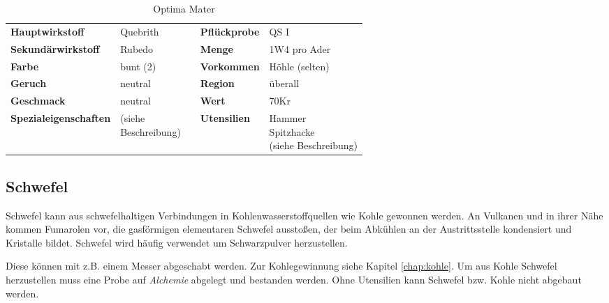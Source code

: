 \begin{table}[H] 
\begin{center} 
\begin{tabular}{|l|l|p{1cm}|l|l|} 
  	\cline{1-2} \cline{4-5} 
  	\textbf{Hauptwirkstoff} & Quebrith && \textbf{Pflückprobe} & QS I \\ \cline{1-2} \cline{4-5} 
  	\textbf{Sekundärwirkstoff} & Rubedo && \textbf{Menge} & 1W4 pro Ader \\ \cline{1-2} \cline{4-5} 
  	\textbf{Farbe} & bunt (2) && \textbf{Vorkommen} & Höhle (selten) \\ \cline{1-2} \cline{4-5} 
  	\textbf{Geruch} & neutral && \textbf{Region} & überall \\ \cline{1-2} \cline{4-5} 
  	\textbf{Geschmack} & neutral && \textbf{Wert} & 70Kr \\ \cline{1-2} \cline{4-5} 
  	\textbf{Spezialeigenschaften} & \brcell{(siehe \\ Beschreibung)} && \textbf{Utensilien} & \brcell{Hammer \\ Spitzhacke \\ (siehe Beschreibung)} \\ \cline{1-2} \cline{4-5} 
\end{tabular} 
\end{center} 
\caption{Optima Mater} 
\label{tab:optima_mater} 
\end{table}


\subsection{Schwefel}
\label{chap:schwefel}
Schwefel kann aus schwefelhaltigen Verbindungen in Kohlenwasserstoffquellen wie Kohle gewonnen werden. An Vulkanen und in ihrer Nähe kommen Fumarolen vor, die gasförmigen elementaren Schwefel ausstoßen, der beim Abkühlen an der Austrittsstelle kondensiert und Kristalle bildet. Schwefel wird häufig verwendet um Schwarzpulver herzustellen.

Diese können mit z.B. einem Messer abgeschabt werden. Zur Kohlegewinnung siehe Kapitel \ref{chap:kohle}. Um aus Kohle Schwefel herzustellen muss eine Probe auf \textit{Alchemie} abgelegt und bestanden werden. Ohne Utensilien kann Schwefel bzw. Kohle nicht abgebaut werden.

